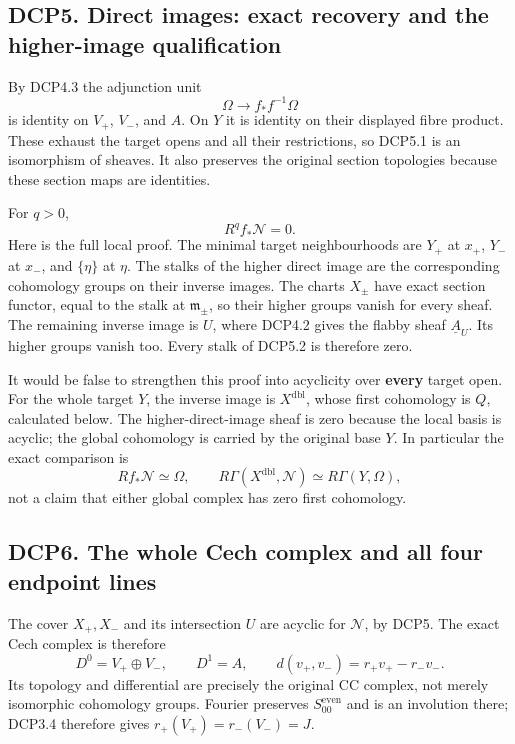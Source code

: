 \subsection{DCP5. Direct images: exact recovery and the higher-image
qualification}\label{dcp5.-direct-images-exact-recovery-and-the-higher-image-qualification}

By DCP4.3 the adjunction unit \[
 \Omega\longrightarrow f_*f^{-1}\Omega
\tag{DCP5.1}
\] is identity on \(V_+\), \(V_-\), and \(A\). On \(Y\) it is identity
on their displayed fibre product. These exhaust the target opens and all
their restrictions, so DCP5.1 is an isomorphism of sheaves. It also
preserves the original section topologies because these section maps are
identities.

For \(q>0\), \[
 R^q f_*\mathcal N=0.
\tag{DCP5.2}
\] Here is the full local proof. The minimal target neighbourhoods are
\(Y_+\) at \(x_+\), \(Y_-\) at \(x_-\), and \(\{\eta\}\) at \(\eta\).
The stalks of the higher direct image are the corresponding cohomology
groups on their inverse images. The charts \(X_\pm\) have exact section
functor, equal to the stalk at \(\mathfrak m_\pm\), so their higher
groups vanish for every sheaf. The remaining inverse image is \(U\),
where DCP4.2 gives the flabby sheaf \(\underline A_U\). Its higher
groups vanish too. Every stalk of DCP5.2 is therefore zero.

It would be false to strengthen this proof into acyclicity over
\textbf{every} target open. For the whole target \(Y\), the inverse
image is \(X^{\mathrm{dbl}}\), whose first cohomology is \(Q\),
calculated below. The higher-direct-image sheaf is zero because the
local basis is acyclic; the global cohomology is carried by the original
base \(Y\). In particular the exact comparison is \[
 Rf_*\mathcal N\simeq\Omega,\qquad
 R\Gamma(X^{\mathrm{dbl}},\mathcal N)
 \simeq R\Gamma(Y,\Omega),
\tag{DCP5.3}
\] not a claim that either global complex has zero first cohomology.

\subsection{DCP6. The whole Cech complex and all four endpoint
lines}\label{dcp6.-the-whole-cech-complex-and-all-four-endpoint-lines}

The cover \(X_+,X_-\) and its intersection \(U\) are acyclic for
\(\mathcal N\), by DCP5. The exact Cech complex is therefore \[
 D^0=V_+\oplus V_-,\qquad D^1=A,\qquad
 d(v_+,v_-)=r_+v_+-r_-v_-.
\tag{DCP6.1}
\] Its topology and differential are precisely the original CC complex,
not merely isomorphic cohomology groups. Fourier preserves
\(S_{00}^{\mathrm{even}}\) and is an involution there; DCP3.4 therefore
gives \(r_+(V_+)=r_-(V_-)=J\).

